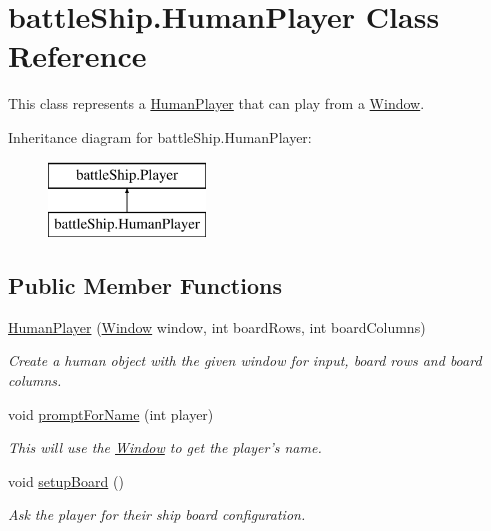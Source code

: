 \hypertarget{classbattleShip_1_1HumanPlayer}{\section{battle\-Ship.\-Human\-Player Class Reference}
\label{classbattleShip_1_1HumanPlayer}
}


This class represents a \hyperlink{classbattleShip_1_1HumanPlayer}{Human\-Player} that can play from a \hyperlink{classbattleShip_1_1Window}{Window}.  


Inheritance diagram for battle\-Ship.\-Human\-Player\-:\begin{figure}[H]
\begin{center}
\leavevmode
\includegraphics[height=2.000000cm]{classbattleShip_1_1HumanPlayer}
\end{center}
\end{figure}
\subsection*{Public Member Functions}
\begin{DoxyCompactItemize}
\item 
\hyperlink{classbattleShip_1_1HumanPlayer_a0e7b1784197eb8c8c80213d0b6e87660}{Human\-Player} (\hyperlink{classbattleShip_1_1Window}{Window} window, int board\-Rows, int board\-Columns)
\begin{DoxyCompactList}\small\item\em Create a human object with the given window for input, board rows and board columns. \end{DoxyCompactList}\item 
void \hyperlink{classbattleShip_1_1HumanPlayer_a64c17bd80baa5f1b2bcb36b34d0746eb}{prompt\-For\-Name} (int player)
\begin{DoxyCompactList}\small\item\em This will use the \hyperlink{classbattleShip_1_1Window}{Window} to get the player's name. \end{DoxyCompactList}\item 
void \hyperlink{classbattleShip_1_1HumanPlayer_ac054fa48213ba59b14c105d686491df9}{setup\-Board} ()
\begin{DoxyCompactList}\small\item\em Ask the player for their ship board configuration. \end{DoxyCompactList}\end{DoxyCompactItemize}
